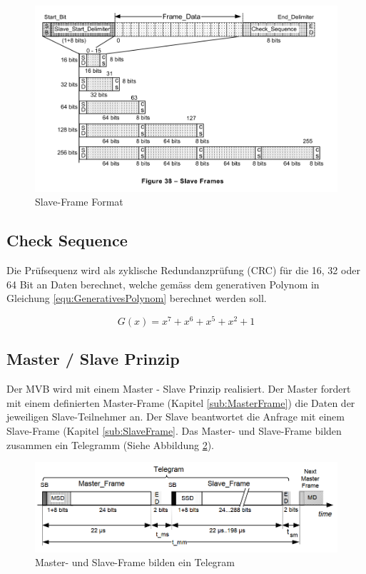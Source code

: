 \begin{figure}[H]
    \centering
    \includegraphics[width = 0.8 \textwidth]{Figures/Chap2/Grundlagen/MVB_DOKU/Frames und Telegramme/Fig38_SlaveFrameFormat.png}
    \caption{Slave-Frame Format}
    \label{fig:SlaveFrameFormat}
\end{figure}

\subsection{Check Sequence}
\label{sub:CheckSequenz}
Die Prüfsequenz wird als zyklische Redundanzprüfung (CRC) für die 16, 32 oder 64 Bit an Daten berechnet, welche gemäss dem generativen Polynom in Gleichung \ref{equ:GenerativesPolynom} berechnet werden soll.

\begin{equation}
    G(x) = x^7 + x^6 + x^5 + x^2 + 1
    \label{equ:GenerativesPolynom}
\end{equation}

\subsection{Master / Slave Prinzip}
\label{sub:MasterSlavePrinzip}
Der MVB wird mit einem Master - Slave Prinzip realisiert. Der Master fordert mit einem definierten Master-Frame (Kapitel \ref{sub:MasterFrame}) die Daten der jeweiligen Slave-Teilnehmer an. Der Slave beantwortet die Anfrage mit einem Slave-Frame (Kapitel \ref{sub:SlaveFrame}. Das Master- und Slave-Frame bilden zusammen ein Telegramm (Siehe Abbildung \ref{fig:Fig39_Telegamm_definition.png}). 

\begin{figure}[H]
    \centering
    \includegraphics[width=0.85\linewidth]{Figures/Chap2/Grundlagen/MVB_DOKU/Frames und Telegramme/Fig39_Telegamm_definition.png}
    \caption{Master- und Slave-Frame bilden ein Telegram}
    \label{fig:Fig39_Telegamm_definition.png}
\end{figure}

